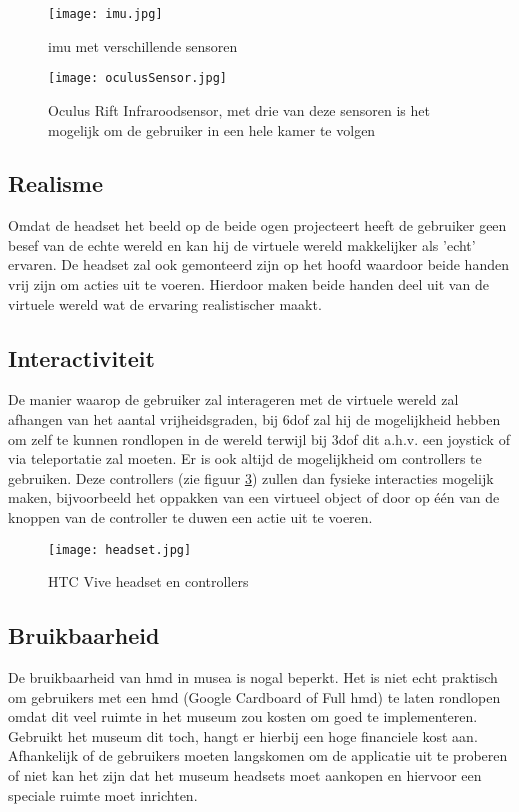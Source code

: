 \begin{figure}
    \texttt{[image: imu.jpg]}
    \caption{\acrshort{imu} met verschillende sensoren \autocite{Shirsath2018}}
    \label{fig:imu}
\end{figure}

\begin{figure}
    \texttt{[image: oculusSensor.jpg]}
    \caption{Oculus Rift Infraroodsensor, met drie van deze sensoren is het mogelijk om de gebruiker in een hele kamer te volgen \autocite{Oculus2019}}
    \label{fig:oculusSensor}
\end{figure}


\subsection{Realisme}
Omdat de headset het beeld op de beide ogen projecteert heeft de gebruiker geen besef van de echte wereld en kan hij de virtuele wereld makkelijker als 'echt' ervaren. De headset zal ook gemonteerd zijn op het hoofd waardoor beide handen vrij zijn om acties uit te voeren. Hierdoor maken beide handen deel uit van de virtuele wereld wat de ervaring realistischer maakt.
\subsection{Interactiviteit}
De manier waarop de gebruiker zal interageren met de virtuele wereld zal afhangen van het aantal vrijheidsgraden, bij \acrshort{6dof} zal hij de mogelijkheid hebben om zelf te kunnen rondlopen in de wereld terwijl bij \acrshort{3dof} dit a.h.v. een joystick of via teleportatie zal moeten. Er is ook altijd de mogelijkheid om controllers te gebruiken. Deze controllers (zie figuur \ref{fig:htcvive}) zullen dan fysieke interacties mogelijk maken, bijvoorbeeld het oppakken van een virtueel object of door op één van de knoppen van de controller te duwen een actie uit te voeren.

\begin{figure}
    \texttt{[image: headset.jpg]}
    \caption{HTC Vive headset en controllers \autocite{Telegraph2018}}
    \label{fig:htcvive}
\end{figure}

\subsection{Bruikbaarheid}
De bruikbaarheid van \acrshort{hmd} in musea is nogal beperkt. Het is niet echt praktisch om gebruikers met een \acrshort{hmd} (Google Cardboard of Full \acrshort{hmd}) te laten rondlopen omdat dit veel ruimte in het museum zou kosten om goed te implementeren. Gebruikt het museum dit toch, hangt er hierbij een hoge financiele kost aan. Afhankelijk of de gebruikers moeten langskomen om de applicatie uit te proberen of niet kan het zijn dat het museum headsets moet aankopen en hiervoor een speciale ruimte moet inrichten.

